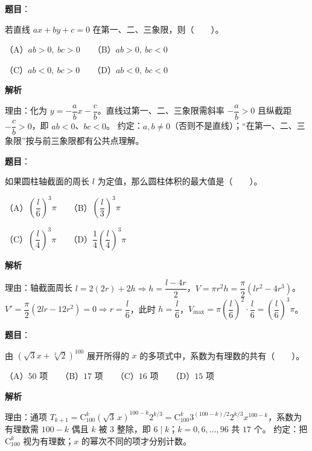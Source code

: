 \begin{answer}

\textbf{题目}：

若直线 $ax+by+c=0$ 在第一、二、三象限，则\mbox{（　　）}。

（A）$ab>0,\ bc>0$　　（B）$ab>0,\ bc<0$

（C）$ab<0,\ bc>0$　　（D）$ab<0,\ bc<0$

\textbf{解析}

理由：化为 $y=-\dfrac ab x-\dfrac cb$。直线过第一、二、三象限需斜率 $-\dfrac ab>0$ 且纵截距 $-\dfrac cb>0$，即 $ab<0$、$bc<0$。
约定：$a,b\ne0$（否则不是直线）；“在第一、二、三象限”按与前三象限都有公共点理解。


\end{answer}
\begin{answer}

\textbf{题目}：

如果圆柱轴截面的周长 $l$ 为定值，那么圆柱体积的最大值是\mbox{（　　）}。

（A）$\left(\dfrac l6\right)^3\pi$　　（B）$\left(\dfrac l3\right)^3\pi$

（C）$\left(\dfrac l4\right)^3\pi$　　（D）$\dfrac14\left(\dfrac l4\right)^3\pi$

\textbf{解析}

理由：轴截面周长 $l=2(2r)+2h\Rightarrow h=\dfrac{l-4r}{2}$，$V=\pi r^2h=\dfrac{\pi}{2}(lr^2-4r^3)$。$V'=\dfrac{\pi}{2}(2lr-12r^2)=0\Rightarrow r=\dfrac l6$，此时 $h=\dfrac l6$，$V_{\max}=\pi\left(\dfrac l6\right)^2\cdot\dfrac l6=\left(\dfrac l6\right)^3\pi$。


\end{answer}
\begin{answer}

\textbf{题目}：

由 $(\sqrt3x+\sqrt[3]2)^{100}$ 展开所得的 $x$ 的多项式中，系数为有理数的共有\mbox{（　　）}。

（A）$50$ 项　　（B）$17$ 项　　（C）$16$ 项　　（D）$15$ 项

\textbf{解析}

理由：通项 $T_{k+1}=\mathrm C_{100}^k(\sqrt3\,x)^{100-k}2^{k/3}=\mathrm C_{100}^k3^{(100-k)/2}2^{k/3}x^{100-k}$，系数为有理数需 $100-k$ 偶且 $k$ 被 $3$ 整除，即 $6\mid k$；$k=0,6,\dots,96$ 共 $17$ 个。
约定：把 $\mathrm C_{100}^k$ 视为有理数；$x$ 的幂次不同的项才分别计数。


\end{answer}

